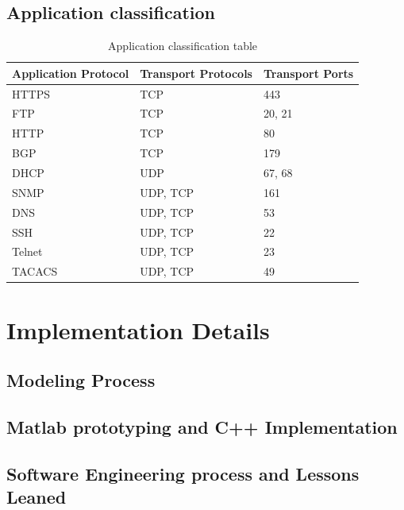 \subsection{Application classification}

\begin{table}[]
\centering
\caption{Application classification table}
\label{my-label}
\begin{tabular}{lll}
\hline
Application Protocol & Transport Protocols & Transport Ports \\ \hline
HTTPS               & TCP                & 443             \\
FTP                 & TCP                & 20, 21          \\
HTTP                & TCP                & 80              \\
BGP                 & TCP                & 179             \\
DHCP                & UDP                & 67, 68          \\
SNMP                & UDP, TCP           & 161             \\
DNS                 & UDP, TCP           & 53              \\
SSH                 & UDP, TCP           & 22              \\
Telnet              & UDP, TCP           & 23              \\
TACACS              & UDP, TCP           & 49              \\ \hline
\end{tabular}
\end{table}




\section{Implementation Details}

\subsection{Modeling Process}

\subsection{Matlab prototyping and C++ Implementation}

\subsection{Software Engineering process and Lessons Leaned}

